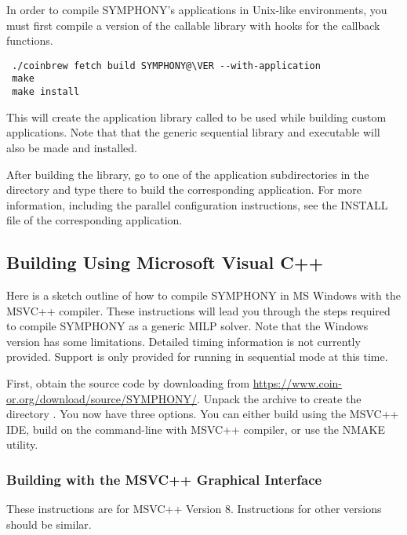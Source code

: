 In order to compile SYMPHONY's applications in Unix-like environments, you
must first compile a version of the callable library with hooks for the
callback functions.
{\color{brown}
\begin{verbatim}
 ./coinbrew fetch build SYMPHONY@\VER --with-application
 make 
 make install
\end{verbatim}
} This will create the application library called  to be used
while building custom applications. Note that that the generic sequential
library and executable will also be made and installed.

After building the library, go to one of the application subdirectories in the
 directory and type  there to build
the corresponding application. For more information, including the parallel
configuration instructions, see the INSTALL file of the corresponding
application.

\subsection{Building Using Microsoft Visual C++}
\label{getting_started_windows}

Here is a sketch outline of how to compile SYMPHONY in MS Windows with the
MSVC++ compiler. These instructions will lead you through the steps required
to compile SYMPHONY as a generic MILP solver. Note that the Windows version
has some limitations. Detailed timing information is not currently provided.
Support is only provided for running in sequential mode at this time.

First, obtain the source code by downloading from
\url{https://www.coin-or.org/download/source/SYMPHONY/}. Unpack the archive to
create the directory . You now have three options. You
can either build using the MSVC++ IDE, build on the command-line with MSVC++
compiler, or use the NMAKE utility.

\subsubsection{Building with the MSVC++ Graphical Interface}
\label{using_msvc}

These instructions are for MSVC++ Version 8. Instructions for other versions
should be similar.

